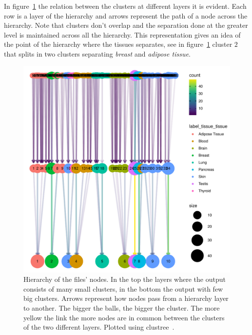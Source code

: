 In figure~\ref{fig:topic/gtex/oversigma_10tissue/bipartite_rebuild} the relation between the clusters at different layers it is evident. Each row is a layer of the hierarchy and arrows represent the path of a node across the hierarchy. Note that clusters don't overlap and the separation done at the greater level is maintained across all the hierarchy. This representation gives an idea of the point of the hierarchy where the tissues separates, see in figure~\ref{fig:topic/gtex/oversigma_10tissue/bipartite_rebuild} cluster $2$ that splits in two clusters separating \textit{breast} and \textit{adipose tissue}.
\begin{figure}[htb!]
    \centering
    \includegraphics[width=0.8\linewidth]{pictures/topic/gtex/oversigma_10tissue/bipartite_rebuild.pdf}
    \caption{Hierarchy of the files' nodes. In the top the layers where the output consists of many small clusters, in the bottom the output with few big clusters. Arrows represent how nodes pass from a hierarchy layer to another. The bigger the balls, the bigger the cluster. The more yellow the link the more nodes are in common between the clusters of the two different layers. Plotted using clustree~\cite{clustree}.}
    \label{fig:topic/gtex/oversigma_10tissue/bipartite_rebuild}
\end{figure}


